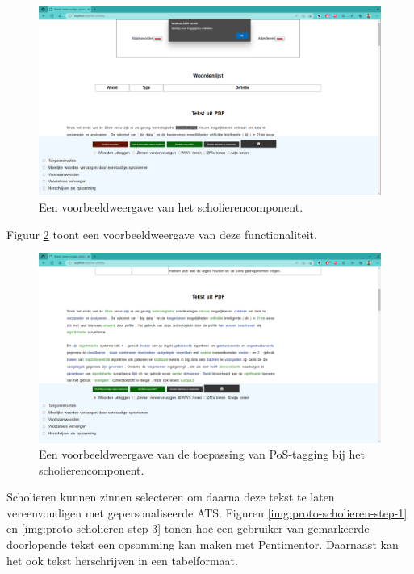 \begin{center}
	\begin{figure}[H]
		\includegraphics[width=\linewidth]{img/proto-melding.png}
		\caption{Een voorbeeldweergave van het scholierencomponent.}
		\label{img:proto-homescreen-scholieren}
	\end{figure}
\end{center}

Figuur \ref{img:proto-pos-tagging-scholieren} toont een voorbeeldweergave van deze functionaliteit. 

\begin{center}
	\begin{figure}[H]
		\includegraphics[width=\linewidth]{img/proto-pos-tagging.png}
		\caption{Een voorbeeldweergave van de toepassing van PoS-tagging bij het scholierencomponent.}
		\label{img:proto-pos-tagging-scholieren}
	\end{figure}
\end{center}

Scholieren kunnen zinnen selecteren om daarna deze tekst te laten vereenvoudigen met gepersonaliseerde ATS. Figuren \ref{img:proto-scholieren-step-1} en \ref{img:proto-scholieren-step-3} tonen hoe een gebruiker van gemarkeerde doorlopende tekst een opsomming kan maken met Pentimentor. Daarnaast kan het ook tekst herschrijven in een tabelformaat.

